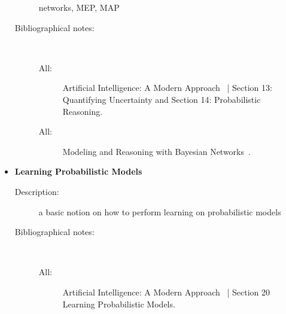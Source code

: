 \documentclass[a4paper,10pt]{article}
\theoremstyle{plain}
\begin{document}
\begin{appendices}
\begin{itemize}
\begin{description}
        networks, MEP, MAP
      \item[Bibliographical notes:]\ \
        \begin{description}
          \item[All:] Artificial Intelligence: A Modern Approach~\cite{aima} | Section 13:
            Quantifying Uncertainty and Section 14: Probabilistic Reasoning.
          \item[All:] Modeling and Reasoning with Bayesian Networks~\cite{bayes-net-darwiche}.
        \end{description}
    \end{description}
  \item \textbf{Learning Probabilistic Models}
    \begin{description}
      \item[Description:] a basic notion on how to perform learning on probabilistic models
      \item[Bibliographical notes:]\ \
        \begin{description}
          \item[All:] Artificial Intelligence: A Modern Approach~\cite{aima} | Section 20 Learning
            Probabilistic Models.
        \end{description}
    \end{description}
\end{itemize}

\end{appendices}

\newpage

\printbibliography[heading=bibintoc]
\end{document}
